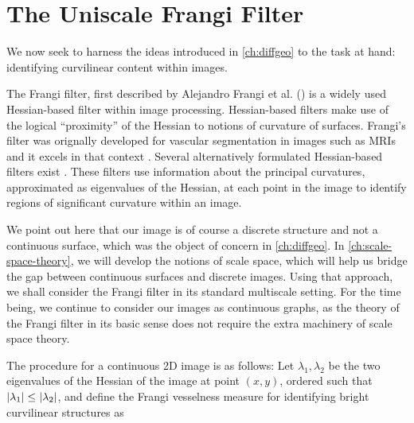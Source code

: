 \chapter{The Uniscale Frangi Filter} \label{ch:unifrangi}

	We now seek to harness the ideas introduced in \cref{ch:diffgeo} to the task at hand: identifying curvilinear content within images.

The Frangi filter, first described by Alejandro Frangi et al. (\citeyear{frangi-paper}) is a widely used  Hessian-based filter
within image processing. Hessian-based filters make use of the
logical ``proximity'' of the Hessian to notions of curvature of surfaces. Frangi's filter was orignally developed for vascular segmentation in images such as MRIs and it excels in that context .
Several alternatively formulated Hessian-based filters exist \autocite{sato-filter,lorenz-filter,olabarriaga-hessian-comparison}. These filters use information about the principal curvatures, approximated as eigenvalues of the Hessian, at each point in the image
to identify regions of significant curvature within an image.

We point out here that our image is of course a discrete structure and not a continuous surface, which was the object of concern in \cref{ch:diffgeo}.
In \cref{ch:scale-space-theory}, we will develop the notions of scale space, which will help us bridge the gap between continuous surfaces and discrete images. Using that approach, we shall consider the Frangi filter in its standard multiscale setting. For the time being, we continue to consider our images as continuous graphs, as the theory of the Frangi filter in its basic sense does not require the extra machinery of scale space theory.


The procedure for a continuous 2D image is as follows:
Let $\lambda_1, \lambda_2$ be the two eigenvalues of the Hessian of the image at point $(x, y)$,
ordered such that $\vert\lambda_1\vert \leq \vert\lambda_2\vert$, and define the Frangi vesselness measure for identifying bright curvilinear structures as %

